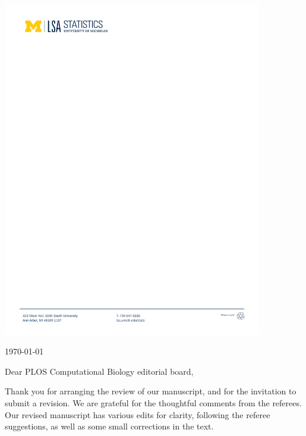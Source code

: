 \documentclass[11pt]{article}
\begin{document}
\rule{0cm}{0.3cm}

\vspace{-8mm}

\includegraphics[width=0.85\textwidth,trim={1.7cm 25.6cm 10cm 1.3cm},clip]{umich-stat-letterhead-2019.pdf}

\vspace{10mm}

\begin{flushright}
\today
\end{flushright}



\vspace{5mm}

Dear PLOS Computational Biology editorial board,

Thank you for arranging the review of our manuscript, and for the invitation to submit a revision.
We are grateful for the thoughtful comments from the referees.
Our revised manuscript has various edits for clarity, following the referee suggestions, as well as some small corrections in the text.
\end{document}
